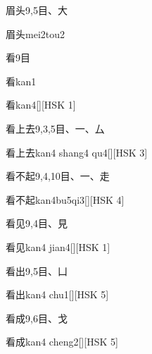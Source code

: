\begin{entry}{眉头}{9,5}{⽬、⼤}
  \begin{phonetics}{眉头}{mei2tou2}
  \end{phonetics}
\end{entry}

\begin{entry}{看}{9}{⽬}
  \begin{phonetics}{看}{kan1}
  \end{phonetics}
  \begin{phonetics}{看}{kan4}[][HSK 1]
  \end{phonetics}
\end{entry}

\begin{entry}{看上去}{9,3,5}{⽬、⼀、⼛}
  \begin{phonetics}{看上去}{kan4 shang4 qu4}[][HSK 3]
  \end{phonetics}
\end{entry}

\begin{entry}{看不起}{9,4,10}{⽬、⼀、⾛}
  \begin{phonetics}{看不起}{kan4bu5qi3}[][HSK 4]
  \end{phonetics}
\end{entry}

\begin{entry}{看见}{9,4}{⽬、⾒}
  \begin{phonetics}{看见}{kan4 jian4}[][HSK 1]
  \end{phonetics}
\end{entry}

\begin{entry}{看出}{9,5}{⽬、⼐}
  \begin{phonetics}{看出}{kan4 chu1}[][HSK 5]
  \end{phonetics}
\end{entry}

\begin{entry}{看成}{9,6}{⽬、⼽}
  \begin{phonetics}{看成}{kan4 cheng2}[][HSK 5]
  \end{phonetics}
\end{entry}

